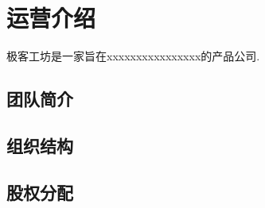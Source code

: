 ﻿\section{运营介绍}
极客工坊是一家旨在xxxxxxxxxxxxxxxx的产品公司.

\subsection{团队简介}


\subsection{组织结构}


\subsection{股权分配}


